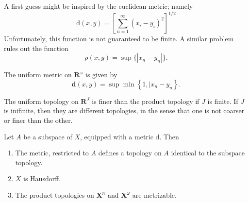 A first guess might be inspired by the euclidean metric; namely
\begin{equation*}
\mathrm{d}(x,y) = \left[\sum_{n=1}^{\infty}(x_i - y_i)^{2} \right]^{1/2}
\end{equation*}
Unfortunately, this function is not guaranteed to be finite. A similar problem
rules out the function
\begin{equation*}
\rho(x,y) = \sup \{ |x_n - y_n| \}.
\end{equation*}
\begin{definition}
The uniform metric on \( \mathbf{R}^{\omega} \) is given by
\begin{equation*}
\mathbf{d}(x,y) = \sup \min \left\{ 1, |x_n - y_n \right\}.
\end{equation*}
\end{definition}
\begin{theorem}
The uniform topology on \( \mathbf{R}^J \) is finer than the product
topology if $J$ is finite. If \( J \) is inifinite, then they are different
topologies, in the sense that one is not coarser or finer than the other.
\end{theorem}
\begin{theorem}
Let \( A \) be a subspace of \( X \), equipped with a metric \( \mathrm{d} \).
Then
\begin{enumerate}
  \item\label{it:restriction-metric-equiv-order} The metric,
		restricted to \( A
  \) defines a topology on \( A \) identical to the subspace topology.
  \item\label{it:metric-is-hausdorff} \( X \) is Hausdorff.
  \item\label{it:prod-top-metrizable} The product topologies on \( \mathbf{X}^n
  \) and \( \mathbf{X}^\omega \) are metrizable.
\end{enumerate}
\end{theorem}
